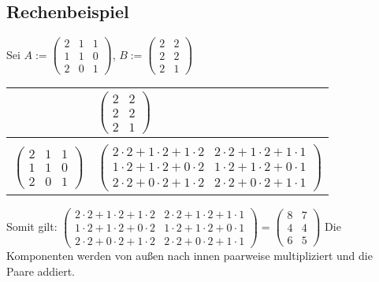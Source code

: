 \subsection{Rechenbeispiel}
Sei $A:=\begin{pmatrix}
            2&1&1\\
            1&1&0\\
            2&0&1
\end{pmatrix}$, $B:=\begin{pmatrix}
                            2&2\\
                            2&2\\
                            2&1
\end{pmatrix}$ \newline
\begin{table}[h!]
    \begin{tabular}{c|l}
        & $ \begin{pmatrix}
                2&2\\
                2&2\\
                2&1
        \end{pmatrix} $ \\[7mm]
        \hline \\ [-3mm]
        $ \begin{pmatrix}
              2&1&1\\
              1&1&0\\
              2&0&1
        \end{pmatrix} $ &
        $ \begin{pmatrix}
              2\cdot 2 + 1\cdot 2 + 1\cdot 2&2\cdot 2 + 1\cdot 2 + 1\cdot 1\\
              1\cdot 2 + 1\cdot 2 + 0\cdot 2&1\cdot 2 + 1\cdot 2 + 0\cdot 1\\
              2\cdot 2 + 0\cdot 2 + 1\cdot 2&2\cdot 2 + 0\cdot 2 + 1\cdot 1
        \end{pmatrix} $
    \end{tabular}\label{tab:table}
    \newline
    \newline
    \newline
    Somit gilt: \newline \newline
    $
        \begin{pmatrix}
              2\cdot 2 + 1\cdot 2 + 1\cdot 2&2\cdot 2 + 1\cdot 2 + 1\cdot 1\\
              1\cdot 2 + 1\cdot 2 + 0\cdot 2&1\cdot 2 + 1\cdot 2 + 0\cdot 1\\
              2\cdot 2 + 0\cdot 2 + 1\cdot 2&2\cdot 2 + 0\cdot 2 + 1\cdot 1
        \end{pmatrix} = \begin{pmatrix}
                                    8&7\\
                                    4&4\\
                                    6&5
        \end{pmatrix}
    $ \newline
    \newline
    Die Komponenten werden von außen nach innen paarweise multipliziert und die Paare addiert.
\end{table}